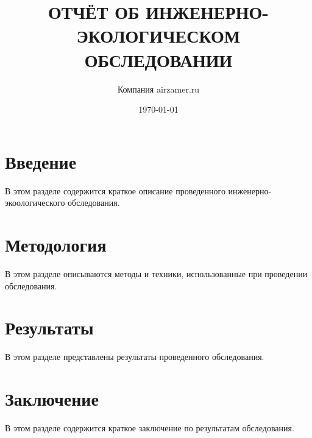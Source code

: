\documentclass{article}
\title{ОТЧЁТ ОБ ИНЖЕНЕРНО-ЭКОЛОГИЧЕСКОМ ОБСЛЕДОВАНИИ}
\author{Компания airzamer.ru}
\date{\today}
\begin{document}
\maketitle

\section{Введение}
В этом разделе содержится краткое описание проведенного инженерно-экоологического обследования.

\section{Методология}
В этом разделе описываются методы и техники, использованные при проведении обследования.

\section{Результаты}
В этом разделе представлены результаты проведенного обследования.

\section{Заключение}
В этом разделе содержится краткое заключение по результатам обследования.
\end{document}
